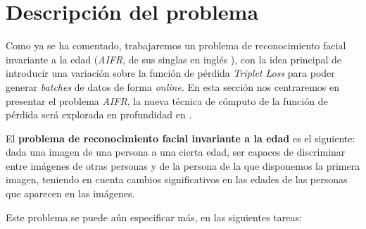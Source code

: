 \section{Descripción del problema} \label{ich:descrp_problema}

Como ya se ha comentado, trabajaremos un problema de reconocimiento facial invariante a la edad (\textit{AIFR}, de sus singlas en inglés ), con la idea principal de introducir una variación sobre la función de pérdida \textit{Triplet Loss} para poder generar \textit{batches} de datos de forma \textit{online}. En esta sección nos centraremos en presentar el problema \textit{AIFR}, la nueva técnica de cómputo de la función de pérdida será explorada en profundidad en .

El \textbf{problema de reconocimiento facial invariante a la edad} es el siguiente: dada una imagen de una persona a una cierta edad, ser capaces de discriminar entre imágenes de otras personas y de la persona de la que disponemos la primera imagen, teniendo en cuenta cambios significativos en las edades de las personas que aparecen en las imágenes.

Este problema se puede aún especificar más, en las siguientes tareas:

